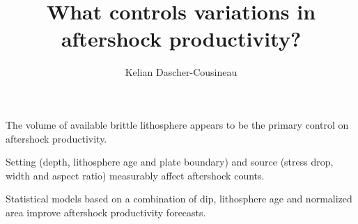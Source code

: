 \documentclass[draft, jgrga]{agujournal2018}
\author{Kelian Dascher-Cousineau}
\begin{document}
\large
\title{What controls variations in aftershock productivity?}











\begin{keypoints}
\item The volume of available brittle lithosphere appears to be the primary control on aftershock productivity.
\item Setting (depth, lithosphere age and plate boundary) and source (stress drop, width and aspect ratio) measurably affect aftershock counts.
\item Statistical models based on a combination of dip, lithosphere age and normalized area improve aftershock productivity forecasts.
\end{keypoints}

\newpage
\end{document}
